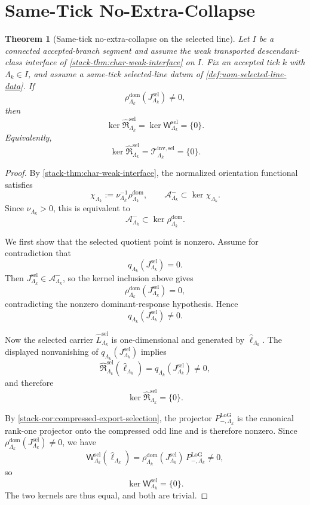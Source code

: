 \documentclass[11pt]{article}
\theoremstyle{definition}
\theoremstyle{plain}
\newtheorem{theorem}[definition]{Theorem}
\theoremstyle{remark}
\begin{document}
\section{Same-Tick No-Extra-Collapse}

\begin{theorem}[Same-tick no-extra-collapse on the selected line]
\label{thm:uom-selected-line-no-extra-collapse}
Let \(I\) be a connected accepted-branch segment and assume the weak transported descendant-class
interface of \cref{stack-thm:char-weak-interface} on \(I\).
Fix an accepted tick \(k\) with \(\Lambda_k\in I\), and assume a same-tick selected-line datum of
\cref{def:uom-selected-line-data}.
If
\[
\rho^{\mathrm{dom}}_{\Lambda_k}(J^{\mathrm{sel}}_{\Lambda_k})\neq 0,
\]
then
\[
\ker\widehat{\mathfrak R}^{\mathrm{sel}}_{\Lambda_k}
=
\ker\mathsf W^{\mathrm{sel}}_{\Lambda_k}
=
\{0\}.
\]
Equivalently,
\[
\ker\widehat{\mathfrak R}^{\mathrm{sel}}_{\Lambda_k}
=
\mathcal T^{\mathrm{inv,sel}}_{\Lambda_k}
=
\{0\}.
\]
\end{theorem}

\begin{proof}
By \cref{stack-thm:char-weak-interface}, the normalized orientation functional satisfies
\[
\chi_{\Lambda_k}
:=
\nu_{\Lambda_k}^{-1}\rho^{\mathrm{dom}}_{\Lambda_k},
\qquad
\mathcal A^-_{\Lambda_k}\subset\ker\chi_{\Lambda_k}.
\]
Since \(\nu_{\Lambda_k}>0\), this is equivalent to
\[
\mathcal A^-_{\Lambda_k}\subset\ker\rho^{\mathrm{dom}}_{\Lambda_k}.
\]

We first show that the selected quotient point is nonzero.
Assume for contradiction that
\[
q_{\Lambda_k}(J^{\mathrm{sel}}_{\Lambda_k})=0.
\]
Then \(J^{\mathrm{sel}}_{\Lambda_k}\in\mathcal A^-_{\Lambda_k}\), so the kernel inclusion above gives
\[
\rho^{\mathrm{dom}}_{\Lambda_k}(J^{\mathrm{sel}}_{\Lambda_k})=0,
\]
contradicting the nonzero dominant-response hypothesis.
Hence
\[
q_{\Lambda_k}(J^{\mathrm{sel}}_{\Lambda_k})\neq 0.
\]

Now the selected carrier \(\widehat L^{\mathrm{sel}}_{\Lambda_k}\) is one-dimensional and generated by
\(\widehat\ell_{\Lambda_k}\).
The displayed nonvanishing of
\(
q_{\Lambda_k}(J^{\mathrm{sel}}_{\Lambda_k})
\)
implies
\[
\widehat{\mathfrak R}^{\mathrm{sel}}_{\Lambda_k}(\widehat\ell_{\Lambda_k})
=
q_{\Lambda_k}(J^{\mathrm{sel}}_{\Lambda_k})
\neq 0,
\]
and therefore
\[
\ker\widehat{\mathfrak R}^{\mathrm{sel}}_{\Lambda_k}=\{0\}.
\]

By \cref{stack-cor:compressed-export-selection}, the projector
\(
P_{-,\Lambda_k}^{\mathrm{LoG}}
\)
is the canonical rank-one projector onto the compressed odd line and is therefore nonzero.
Since
\(
\rho^{\mathrm{dom}}_{\Lambda_k}(J^{\mathrm{sel}}_{\Lambda_k})\neq 0
\),
we have
\[
\mathsf W^{\mathrm{sel}}_{\Lambda_k}(\widehat\ell_{\Lambda_k})
=
\rho^{\mathrm{dom}}_{\Lambda_k}(J^{\mathrm{sel}}_{\Lambda_k})\,P_{-,\Lambda_k}^{\mathrm{LoG}}
\neq 0,
\]
so
\[
\ker\mathsf W^{\mathrm{sel}}_{\Lambda_k}=\{0\}.
\]
The two kernels are thus equal, and both are trivial.
\end{proof}
\end{document}
